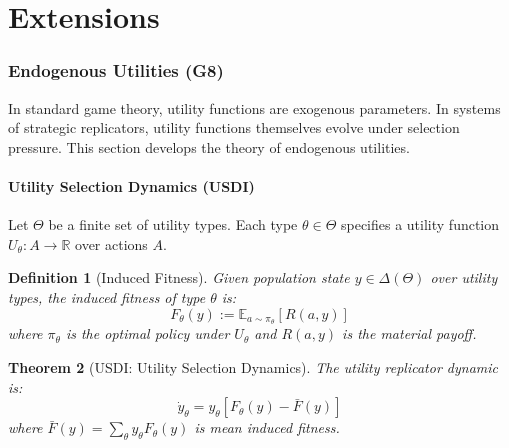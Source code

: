 \documentclass[12pt]{article}
\newtheorem{theorem}{Theorem}[section]
\newtheorem{definition}[theorem]{Definition}
\newcommand{\R}{\mathbb{R}}
\newcommand{\E}{\mathbb{E}}
\begin{document}
\part{Extensions}

\section{Endogenous Utilities (G8)}
\label{sec:g8}

In standard game theory, utility functions are exogenous parameters. In systems of strategic replicators, utility functions themselves evolve under selection pressure. This section develops the theory of endogenous utilities.

\subsection{Utility Selection Dynamics (USDI)}

Let $\Theta$ be a finite set of utility types. Each type $\theta \in \Theta$ specifies a utility function $U_\theta: A \to \R$ over actions $A$.

\begin{definition}[Induced Fitness]
Given population state $y \in \Delta(\Theta)$ over utility types, the \emph{induced fitness} of type $\theta$ is:
\[
F_\theta(y) := \E_{a \sim \pi_\theta}[R(a, y)]
\]
where $\pi_\theta$ is the optimal policy under $U_\theta$ and $R(a, y)$ is the material payoff.
\end{definition}

\begin{theorem}[USDI: Utility Selection Dynamics]
\label{thm:usdi}
The utility replicator dynamic is:
\[
\dot{y}_\theta = y_\theta \left[ F_\theta(y) - \bar{F}(y) \right]
\]
where $\bar{F}(y) = \sum_\theta y_\theta F_\theta(y)$ is mean induced fitness.
\end{theorem}
\end{document}
